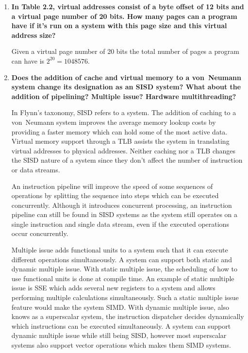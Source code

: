 \begin{enumerate}
\begin{enumerate}
\end{enumerate}


\item \textbf{In Table 2.2, virtual addresses consist of a byte offset of 12 bits and a virtual page number of 20 bits. How many pages can a program have if it's run on a system with this page size and this virtual address size?}

Given a virtual page number of 20 bits the total number of pages a program can have is $2^{20} = 1048576$.

\item \textbf{Does the addition of cache and virtual memory to a von~Neumann system change its designation as an SISD system? What about the addition of pipelining? Multiple issue? Hardware multithreading?}

In Flynn's taxonomy, SISD refers to a  system. The addition of caching to a von~Neumann system improves the average memory lookup costs by providing a faster memory which can hold some of the most active data. Virtual memory support through a \ac{TLB} assists the system in translating virtual addresses to physical addresses. Neither caching nor a \ac{TLB} changes the \ac{SISD} nature of a system since they don't affect the number of instruction or data streams.

An instruction pipeline will improve the speed of some sequences of operations by splitting the sequence into steps which can be executed concurrently. Although it introduces concurrent processing, an instruction pipeline can still be found in \ac{SISD} systems as the system still operates on a single instruction and single data stream, even if the executed operations occur concurrently.

Multiple issue adds functional units to a system such that it can execute different operations simultaneously. A system can support both static and dynamic multiple issue. With static multiple issue, the scheduling of how to use functional units is done at compile time. An example of static multiple issue is \ac{SSE} which adds several new registers to a system and allows performing multiple calculations simultaneously. Such a static multiple issue feature would make the system \ac{SIMD}. With dynamic multiple issue, also knows as a superscalar system, the instruction dispatcher decides dynamically which instructions can be executed simultaneously. A system can support dynamic multiple issue while still being \ac{SISD}, however most superscalar systems also support vector operations which makes them \ac{SIMD} systems. 


\end{enumerate}

